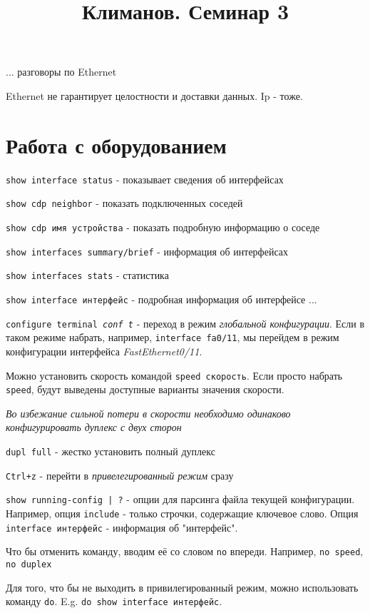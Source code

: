 \documentclass[a4paper,12pt]{article}
\title{Климанов. Семинар 3}
\begin{document}
	\maketitle
	
	... разговоры по Ethernet
	
	Ethernet не гарантирует целостности и доставки данных. Ip - тоже.
	
	\section{Работа с оборудованием}
	\texttt{show interface status} - показывает сведения об интерфейсах
	
	\texttt{show cdp neighbor} - показать подключенных соседей
	
	\texttt{show cdp имя устройства} - показать подробную информацию о соседе
	
	\texttt{show interfaces summary/brief} - информация об интерфейсах
	
	\texttt{show interfaces stats}  - статистика
	
	\texttt{show interface интерфейс} - подробная информация об интерфейсе
	...
	
	\texttt{configure terminal \textit{conf t}} - переход в режим \emph{глобальной конфигурации}. Если в таком режиме набрать, например, \texttt{interface fa0/11}, мы перейдем в режим конфигурации интерфейса \emph{FastEthernet0/11}.
	
	Можно установить скорость командой \texttt{speed скорость}. Если просто набрать \texttt{speed}, будут выведены доступные варианты значения скорости.
	
	\textit{Во избежание сильной потери в скорости необходимо одинаково конфигурировать дуплекс с двух сторон}
	
	\texttt{dupl full} - жестко установить полный дуплекс
	
	\texttt{Ctrl+z} - перейти в \emph{привелегированный режим} сразу
	
	\texttt{show running-config | ?} - опции для парсинга файла текущей конфигурации. Например, опция \texttt{include} - только строчки, содержащие ключевое слово. Опция \texttt{interface интерфейс} - информация об "интерфейс".
	
	Что бы отменить команду, вводим её со словом \texttt{no} впереди. Например, \texttt{no speed}, \texttt{no duplex}
	
	Для того, что бы не выходить в привилегированный режим, можно использовать команду \texttt{do}. E.g. \texttt{do show interface интерфейс}.
	
\end{document}
